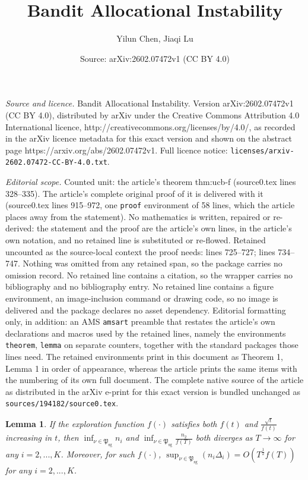 \documentclass[10pt,a4paper]{amsart}
\title{Bandit Allocational Instability}
\author{Yilun Chen, Jiaqi Lu}
\date{Source: arXiv:2602.07472v1 (CC BY 4.0)}
\newtheorem{lemma}{Lemma}
\begin{document}
\maketitle

\noindent\emph{Source and licence.} Bandit Allocational Instability. Version arXiv:2602.07472v1 (CC BY 4.0), distributed by arXiv under the Creative Commons Attribution 4.0 International licence, http://creativecommons.org/licenses/by/4.0/, as recorded in the arXiv licence metadata for this exact version and shown on the abstract page https://arxiv.org/abs/2602.07472v1. Full licence notice: \texttt{licenses/arxiv-2602.07472-CC-BY-4.0.txt}.\par\smallskip

\noindent\textit{Editorial scope.} Counted unit: the article's theorem thm:ucb-f (source0.tex lines 328--335). The article's complete original proof of it is delivered with it (source0.tex lines 915--972, one \texttt{proof} environment of 58 lines, which the article places away from the statement). No mathematics is written, repaired or re-derived: the statement and the proof are the article's own lines, in the article's own notation, and no retained line is substituted or re-flowed.  Retained uncounted as the source-local context the proof needs: lines 725--727; lines 734--747.  Nothing was omitted from any retained span, so the package carries no omission record.  No retained line contains a citation, so the wrapper carries no bibliography and no bibliography entry.  No retained line contains a figure environment, an image-inclusion command or drawing code, so no image is delivered and the package declares no asset dependency.  Editorial formatting only, in addition: an AMS \texttt{amsart} preamble that restates the article's own declarations and macros used by the retained lines, namely the environments \texttt{theorem}, \texttt{lemma} on separate counters, together with the standard packages those lines need.  The retained environments print in this document as Theorem 1, Lemma 1 in order of appearance, whereas the article prints the same items with the numbering of its own full document.  The complete native source of the article as distributed in the arXiv e-print for this exact version is bundled unchanged as \texttt{sources/194182/source0.tex}.
\begin{lemma}\label{lem:n_i_asymptotics}
 If the exploration function $f(\cdot)$ satisfies both $f(t)$ and $\frac{\sqrt{t}}{f(t)}$ increasing in $t$, then $\inf_{\nu\in\mathfrak{P}_{\text{sg}}}n_i$ and $\inf_{\nu\in\mathfrak{P}_{\text{sg}}}\frac{n_2}{f(T)}$ both diverges as $T \to \infty$ for any $i=2,...,K$. Moreover, for such $f(\cdot)$, $\sup_{\nu\in\mathfrak{P}_{\text{sg}}}(n_i\Delta_i)=O\left(T^{\frac{1}{2}}f(T)\right)$ for any $i=2,...,K$. 
\end{lemma}
\end{document}
